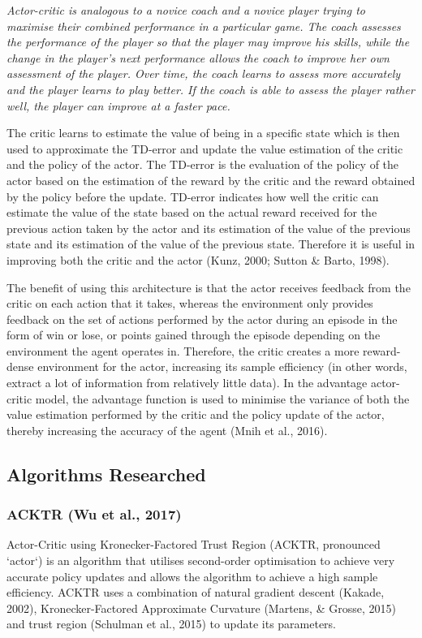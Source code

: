 \textit{Actor-critic is analogous to a novice coach and a novice player trying to maximise their combined performance in a particular game. The coach assesses the performance of the player so that the player may improve his skills, while the change in the player\rq s next performance allows the coach to improve her own assessment of the player. Over time, the coach learns to assess more accurately and the player learns to play better. If the coach is able to assess the player rather well, the player can improve at a faster pace.}

The critic learns to estimate the value of being in a specific state which is then used to approximate the TD-error and update the value estimation of the critic and the policy of the actor. The TD-error is the evaluation of the policy of the actor based on the estimation of the reward by the critic and the reward obtained by the policy before the update. TD-error indicates how well the critic can estimate the value of the state based on the actual reward received for the previous action taken by the actor and its estimation of the value of the previous state and its estimation of the value of the previous state. Therefore it is useful in improving both the critic and the actor (Kunz, 2000; Sutton \& Barto, 1998). 

The benefit of using this architecture is that the actor receives feedback from the critic on each action that it takes, whereas the environment only provides feedback on the set of actions performed by the actor during an episode in the form of win or lose, or points gained through the episode depending on the environment the agent operates in. Therefore, the critic creates a more reward-dense environment for the actor, increasing its sample efficiency (in other words, extract a lot of information from relatively little data). In the advantage actor-critic model, the advantage function is used to minimise the variance of both the value estimation performed by the critic and the policy update of the actor, thereby increasing the accuracy of the agent (Mnih et al., 2016).

\subsection*{Algorithms Researched}
\subsubsection*{ACKTR (Wu et al., 2017)}
Actor-Critic using Kronecker-Factored Trust Region (ACKTR, pronounced `actor`) is an algorithm that utilises second-order optimisation to achieve very accurate policy updates and allows the algorithm to achieve a high sample efficiency. ACKTR uses a combination of natural gradient descent (Kakade, 2002), Kronecker-Factored Approximate Curvature (Martens, \& Grosse, 2015) and trust region (Schulman et al., 2015) to update its parameters. 


